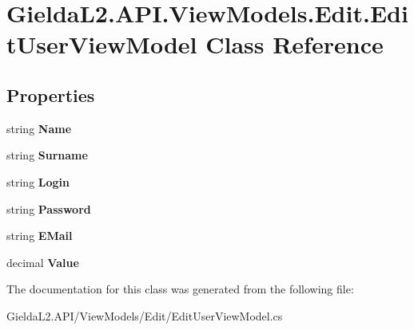 \hypertarget{class_gielda_l2_1_1_a_p_i_1_1_view_models_1_1_edit_1_1_edit_user_view_model}{}\section{Gielda\+L2.\+A\+P\+I.\+View\+Models.\+Edit.\+Edit\+User\+View\+Model Class Reference}
\label{class_gielda_l2_1_1_a_p_i_1_1_view_models_1_1_edit_1_1_edit_user_view_model}
\subsection*{Properties}
\begin{DoxyCompactItemize}
\item 
\mbox{\label{class_gielda_l2_1_1_a_p_i_1_1_view_models_1_1_edit_1_1_edit_user_view_model_ae9109f069c9be093838d88fe9369033a}} 
string {\bfseries Name}
\item 
\mbox{\label{class_gielda_l2_1_1_a_p_i_1_1_view_models_1_1_edit_1_1_edit_user_view_model_adcce071d361066aff2b1d196ec6a28ff}} 
string {\bfseries Surname}
\item 
\mbox{\label{class_gielda_l2_1_1_a_p_i_1_1_view_models_1_1_edit_1_1_edit_user_view_model_a3d111ad59c972cc3bf50f579c7d6ed4b}} 
string {\bfseries Login}
\item 
\mbox{\label{class_gielda_l2_1_1_a_p_i_1_1_view_models_1_1_edit_1_1_edit_user_view_model_a259ece96f9fd350acf96b8eed6d0ae16}} 
string {\bfseries Password}
\item 
\mbox{\label{class_gielda_l2_1_1_a_p_i_1_1_view_models_1_1_edit_1_1_edit_user_view_model_a0abf50d8c74646aeaf635c8837d8e3f3}} 
string {\bfseries E\+Mail}
\item 
\mbox{\label{class_gielda_l2_1_1_a_p_i_1_1_view_models_1_1_edit_1_1_edit_user_view_model_a9a5d82ee4d094190f2a4bdcca7ccb0e6}} 
decimal {\bfseries Value}
\end{DoxyCompactItemize}


The documentation for this class was generated from the following file\+:\begin{DoxyCompactItemize}
\item 
Gielda\+L2.\+A\+P\+I/\+View\+Models/\+Edit/Edit\+User\+View\+Model.\+cs\end{DoxyCompactItemize}
